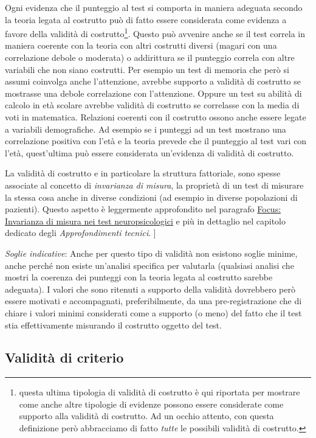 \documentclass[
  italian,
  letterpaper,
  paper=A4,
  headinclude=on,
  footinclude=on,
  12pt]{scrbook}
\begin{document}
Ogni evidenza che il punteggio al test si comporta in maniera adeguata
secondo la teoria legata al costrutto può di fatto essere considerata
come evidenza a favore della validità di costrutto\footnote{questa
  ultima tipologia di validità di costrutto è qui riportata per mostrare
  come anche altre tipologie di evidenze possono essere considerate come
  supporto alla validità di costrutto. Ad un occhio attento, con questa
  definizione però abbracciamo di fatto \emph{tutte} le possibili
  validità di costrutto.}. Questo può avvenire anche se il test correla
in maniera coerente con la teoria con altri costrutti diversi (magari
con una correlazione debole o moderata) o addirittura se il punteggio
correla con altre variabili che non siano costrutti. Per esempio un test
di memoria che però si assumi coinvolga anche l'attenzione, avrebbe
supporto a validità di costrutto se mostrasse una debole correlazione
con l'attenzione. Oppure un test su abilità di calcolo in età scolare
avrebbe validità di costrutto se correlasse con la media di voti in
matematica. Relazioni coerenti con il costrutto ossono anche essere
legate a variabili demografiche. Ad esempio se i punteggi ad un test
mostrano una correlazione positiva con l'età e la teoria prevede che il
punteggio al test vari con l'età, quest'ultima può essere considerata
un'evidenza di validità di costrutto.

La validità di costrutto e in particolare la struttura fattoriale, sono
spesse associate al concetto di \emph{invarianza di misura}, la
proprietà di un test di misurare la stessa cosa anche in diverse
condizioni (ad esempio in diverse popolazioni di pazienti). Questo
aspetto è leggermente approfondito nel paragrafo
\hyperref[invarianza-intro]{Focus: Invarianza di misura nei test
neuropsicologici} e più in dettaglio nel capitolo dedicato degli
\emph{Approfondimenti tecnici}. {]}

\emph{Soglie indicative}: Anche per questo tipo di validità non esistono
soglie minime, anche perché non esiste un'analisi specifica per
valutarla (qualsiasi analisi che mostri la coerenza dei punteggi con la
teoria legata al costrutto sarebbe adeguata). I valori che sono ritenuti
a supporto della validità dovrebbero però essere motivati e
accompagnati, preferibilmente, da una pre-registrazione che di chiare i
valori minimi considerati come a supporto (o meno) del fatto che il test
stia effettivamente misurando il costrutto oggetto del test.

\subsection{Validità di criterio}\label{validituxe0-di-criterio}
\end{document}
